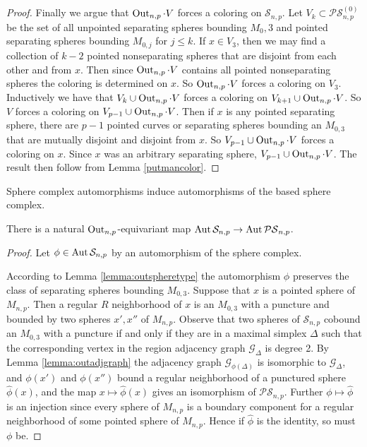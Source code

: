 \begin{proof}
  Finally we argue that $\operatorname{Out}_{n,p} \cdot V$ forces a coloring on $\mathcal S_{n,p}$.
  Let $V_k \subset \mathcal{PS}_{n,p}^{(0)}$ be the set of all
  unpointed separating spheres bounding $M_0,3$ and
  pointed separating spheres bounding $M_{0,j}$ for $j\leq k$.
  If $x \in V_3$, then we may find a collection of $k-2$ pointed nonseparating spheres that are
  disjoint from each other and from $x$.
  Then since $\operatorname{Out}_{n,p} \cdot V$ contains all pointed nonseparating spheres the coloring is determined on $x$.
  So $\operatorname{Out}_{n,p} \cdot V$ forces a coloring on $V_3$.
  Inductively we have that $V_k \cup \operatorname{Out}_{n,p} \cdot V$ forces a coloring on $V_{k+1} \cup \operatorname{Out}_{n,p} \cdot V$.
  So $V$ forces a coloring on $V_{p-1} \cup \operatorname{Out}_{n,p} \cdot V$.
  Then if $x$ is any pointed separating sphere,
  there are $p-1$ pointed curves or separating spheres bounding an $M_{0,3}$ that are mutually disjoint and disjoint from
   $x$.
  So $V_{p-1} \cup \operatorname{Out}_{n,p} \cdot V$ forces a coloring on $x$.
  Since $x$ was an arbitrary separating sphere, $V_{p-1} \cup \operatorname{Out}_{n,p} \cdot V$.
  The result then follow from Lemma \ref{putmancolor}.
\end{proof}

\begin{lemma}
  Sphere complex automorphisms induce automorphisms of the based sphere complex.

  There is a natural $\operatorname{Out}_{n,p}$-equivariant map
  $\operatorname{Aut} \mathcal S_{n,p} \to \operatorname{Aut} \mathcal{PS}_{n,p}$.
  \label{lemma:outbasedspheres}
\end{lemma}

\begin{proof}
  Let $\phi \in \operatorname{Aut} \mathcal S_{n,p}$ by an automorphism of the sphere complex.

  According to Lemma \ref{lemma:outspheretype} the automorphism $\phi$
  preserves the class of separating spheres bounding $M_{0,3}$.
  Suppose that $x$ is a pointed sphere of $M_{n,p}$.
  Then a regular $R$ neighborhood of $x$ is an $M_{0,3}$
  with a puncture and bounded by two spheres $x',x''$ of $M_{n,p}$.
  Observe that two spheres of $\mathcal S_{n,p}$ cobound an $M_{0,3}$
  with a puncture if and only if they are in a maximal simplex $\Delta$
  such that the corresponding vertex in the region adjacency graph $\mathcal G_\Delta$
  is degree 2.
  By Lemma \ref{lemma:outadjgraph} the adjacency graph $\mathcal G_{\phi(\Delta)}$
  is isomorphic to $\mathcal G_\Delta$,
  and $\phi(x')$ and $\phi(x'')$ bound a regular neighborhood of a punctured sphere $\hat \phi(x)$,
  and the map $x \mapsto \hat \phi(x)$ gives an isomorphism of $\mathcal {PS}_{n,p}$.
  Further $\phi \mapsto \hat \phi$ is an injection since every sphere of $M_{n,p}$
  is a boundary component for a regular neighborhood of some pointed sphere of $M_{n,p}$.
  Hence if $\hat \phi$ is the identity, so must $\phi$ be.
\end{proof}

